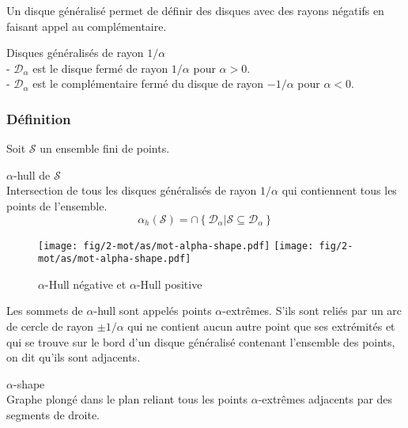 Un disque généralisé permet de définir des disques avec des rayons négatifs en faisant appel au complémentaire.

\begin{Definition}{Disques généralisés de rayon $1/\alpha$}\\
\label{def:dis-gen}
   \noindent - $\mathcal{D}_{\alpha}$ est le disque fermé de rayon $1/\alpha$ pour $\alpha > 0$.\\
   \noindent - $\mathcal{D}_{\alpha}$ est le complémentaire fermé du disque de rayon $- 1/\alpha$ pour $\alpha < 0$.
\end{Definition}

\subsubsection{Définition}

Soit $\mathcal{S}$ un ensemble fini de points. 

\begin{Definition}{$\alpha$-hull de $\mathcal{S}$}\\
\label{def:ah-txt}
    Intersection de tous les disques généralisés de rayon $1/\alpha$ qui contiennent tous les points de l'ensemble.
    $$ \alpha_h(\mathcal{S}) = \cap \left\{ \mathcal{D}_{\alpha} | \mathcal{S} \subseteq \mathcal{D}_{\alpha} \right\}$$
\end{Definition}

\begin{figure}[H]
  \centering
  \texttt{[image: fig/2-mot/as/mot-alpha-shape.pdf]}
  \texttt{[image: fig/2-mot/as/mot-alpha-shape.pdf]}
  \caption{$\alpha$-Hull négative et $\alpha$-Hull positive }
\end{figure}
  
Les sommets de $\alpha$-hull sont appelés points $\alpha$-extrêmes. S'ils sont reliés par un arc de cercle de rayon $\pm 1/ \alpha$ qui ne contient aucun autre point que ses extrémités et qui se trouve sur le bord d'un disque généralisé contenant l'ensemble des points, on dit qu'ils sont adjacents.

\begin{Definition}{$\alpha$-shape}\\
\label{def:as}
      Graphe plongé dans le plan reliant tous les points $\alpha$-extrêmes adjacents par des segments de droite.
\end{Definition}

